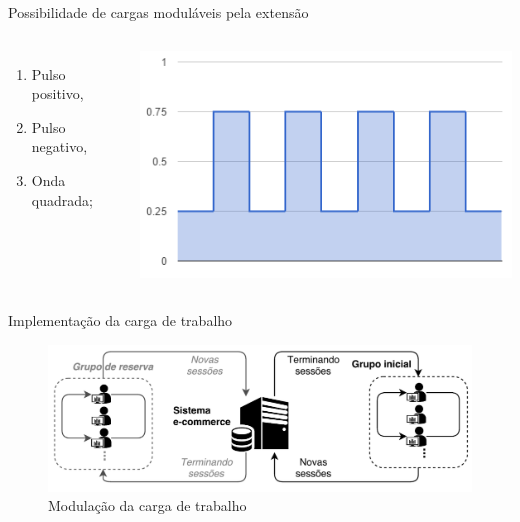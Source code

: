 \begin{frame}{Possibilidade de cargas moduláveis pela extensão}
\begin{columns}
\begin{minipage}[c][0.4\textheight][c]{\linewidth}
\begin{enumerate}
				\item Pulso positivo,
				\item Pulso negativo,
				\item Onda quadrada;
			\end{enumerate}
		\end{minipage}
		\begin{minipage}[c][0.4\textheight][t]{\linewidth}
			\centering
			\includegraphics[width=0.84\linewidth]{../monograph/images/carga-sintetica3.png}
			\label{fig:onda-gradrada}
		\end{minipage}
	\end{columns}
	
\end{frame}

\begin{frame}{Implementação da carga de trabalho}
	\begin{figure}[htb]
		\centering
		\includegraphics[scale=0.4]{images/operacaoes_dentro_sessao.png}	
		\caption{Modulação da carga de trabalho \cite{Edwin2015}}
	\end{figure}
\end{frame}
